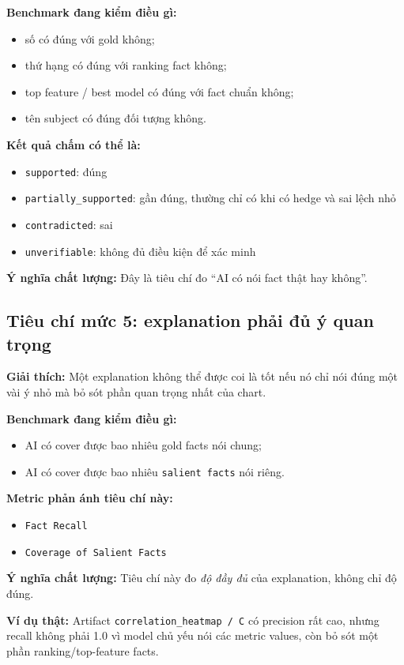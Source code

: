 \documentclass[11pt,a4paper]{article}
\newcommand{\field}[1]{\texttt{#1}}
\begin{document}
\textbf{Benchmark đang kiểm điều gì:}
\begin{itemize}
  \item số có đúng với gold không;
  \item thứ hạng có đúng với ranking fact không;
  \item top feature / best model có đúng với fact chuẩn không;
  \item tên subject có đúng đối tượng không.
\end{itemize}

\textbf{Kết quả chấm có thể là:}
\begin{itemize}
  \item \field{supported}: đúng
  \item \field{partially\_supported}: gần đúng, thường chỉ có khi có hedge và sai lệch nhỏ
  \item \field{contradicted}: sai
  \item \field{unverifiable}: không đủ điều kiện để xác minh
\end{itemize}

\textbf{Ý nghĩa chất lượng:}
Đây là tiêu chí đo ``AI có nói fact thật hay không''.

\subsection{Tiêu chí mức 5: explanation phải đủ ý quan trọng}
\textbf{Giải thích:}
Một explanation không thể được coi là tốt nếu nó chỉ nói đúng một vài ý nhỏ mà bỏ sót phần quan trọng nhất của chart.

\textbf{Benchmark đang kiểm điều gì:}
\begin{itemize}
  \item AI có cover được bao nhiêu gold facts nói chung;
  \item AI có cover được bao nhiêu \field{salient facts} nói riêng.
\end{itemize}

\textbf{Metric phản ánh tiêu chí này:}
\begin{itemize}
  \item \field{Fact Recall}
  \item \field{Coverage of Salient Facts}
\end{itemize}

\textbf{Ý nghĩa chất lượng:}
Tiêu chí này đo \emph{độ đầy đủ} của explanation, không chỉ độ đúng.

\textbf{Ví dụ thật:}
Artifact \field{correlation\_heatmap / C} có precision rất cao,
nhưng recall không phải 1.0 vì model chủ yếu nói các metric values, còn bỏ sót một phần ranking/top-feature facts.
\end{document}
